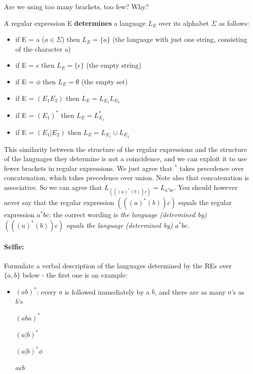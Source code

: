 Are we using too many brackets, too few? Why?

\begin{definition}
A regular expression E {\bf determines} a
language $L_E$ over its alphabet $\Sigma$ as follows:
\begin{itemize}
\item if E = a ($a \in \Sigma$) then $L_E = \{a\}$ (the language with
just one string, consisting of the character a)
\item if E = $\epsilon$ then $L_E = \{\epsilon\}$ (the empty string)
\item if E = $\phi$ then $L_E = \emptyset$ (the empty set)
\item if E = $(E_1E_2)$ then $L_E = L_{E_1}L_{E_2}$
\item if E = $(E_1)^*$ then $L_E = L_{E_1}^*$
\item if E = $(E_1 | E_2)$ then $L_E = L_{E_1} \cup L_{E_2}$
\end{itemize}
\end{definition}

This similarity between the structure of the regular expressions and
the structure of the languages they determine is not a coincidence,
and we can exploit it to use fewer brackets in regular expressions. We
just agree that $^*$ takes precedence over concatenation, which takes
precedence over union. Note also that concatenation is associative. So
we can agree that $L_{(((a)^*(b))c)} = L_{a^*bc}$. You should however
never say that the regular expression $(((a)^*(b))c)$ equals the
regular expression $a^*bc$: the correct wording is {\em the language
(determined by) $(((a)^*(b))c)$ equals the language (determined by)
$a^*bc$}.

\paragraph{Selfie:}
Formulate a verbal description of the languages determined by the REs
over $\{a,b\}$ below - the first one is an example:

\begin{itemize}
\item[]
$(ab)^*$: every $a$ is followed immediately by a $b$, and there are as
many $a$'s as $b$'s

$(aba)^*$

$(a|b)^*$

$(a|b)^*\phi$

$a \epsilon b$
\end{itemize}

